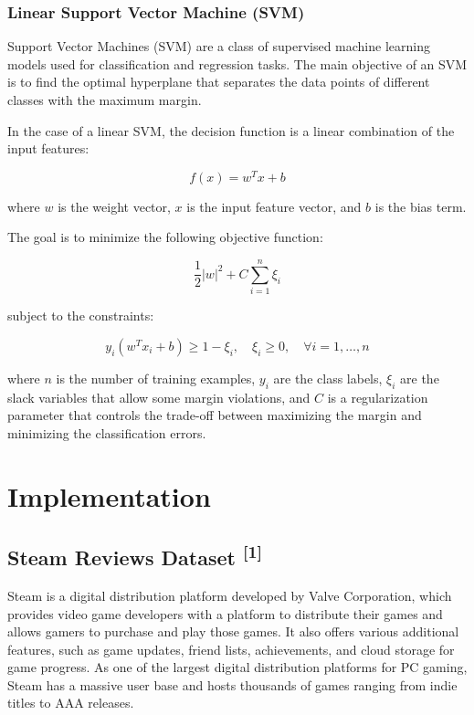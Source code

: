 \documentclass{article}
\begin{document}
\subsubsection{Linear Support Vector Machine (SVM)}

Support Vector Machines (SVM) are a class of supervised machine learning models used for classification and regression tasks. The main objective of an SVM is to find the optimal hyperplane that separates the data points of different classes with the maximum margin.

In the case of a linear SVM, the decision function is a linear combination of the input features:

\begin{equation}
f(x) = w^T x + b
\end{equation}

where $w$ is the weight vector, $x$ is the input feature vector, and $b$ is the bias term.

The goal is to minimize the following objective function:

\begin{equation}
\frac{1}{2} |w|^2 + C \sum_{i=1}^{n} \xi_i
\end{equation}

subject to the constraints:

\begin{equation}
y_i (w^T x_i + b) \geq 1 - \xi_i, \quad \xi_i \geq 0, \quad \forall i = 1, \dots, n
\end{equation}

where $n$ is the number of training examples, $y_i$ are the class labels, $\xi_i$ are the slack variables that allow some margin violations, and $C$ is a regularization parameter that controls the trade-off between maximizing the margin and minimizing the classification errors.


\section{Implementation}

\subsection{Steam Reviews Dataset \textsuperscript{[1]}}

Steam is a digital distribution platform developed by Valve Corporation, which provides video game developers with a platform to distribute their games and allows gamers to purchase and play those games. It also offers various additional features, such as game updates, friend lists, achievements, and cloud storage for game progress. As one of the largest digital distribution platforms for PC gaming, Steam has a massive user base and hosts thousands of games ranging from indie titles to AAA releases.
\end{document}
